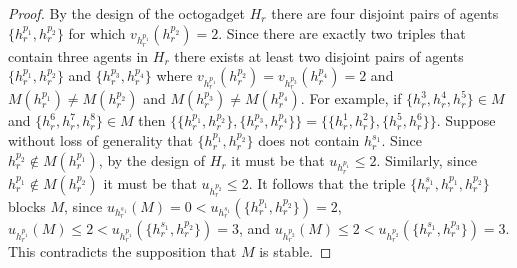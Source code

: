 \begin{proof}
By the design of the octogadget $H_r$ there are four disjoint pairs of agents $\{ h_r^{p_1}, h_r^{p_2} \}$ for which $v_{h_r^{p_1}}(h_r^{p_2})=2$. Since there are exactly two triples that contain three agents in $H_r$ there exists at least two disjoint pairs of agents $\{ h_r^{p_1}, h_r^{p_2} \}$ and $\{ h_r^{p_3}, h_r^{p_4} \}$ where $v_{h_r^{p_1}}(h_r^{p_2})=v_{h_r^{p_3}}(h_r^{p_4})=2$ and $M(h_r^{p_1}) \neq M(h_r^{p_2})$ and $M(h_r^{p_3}) \neq M(h_r^{p_4})$. For example, if $\{ h_r^3, h_r^4, h_r^5 \} \in M$ and $\{ h_r^6, h_r^7, h_r^8 \} \in M$ then $\{ \{ h_r^{p_1}, h_r^{p_2} \}, \{ h_r^{p_3}, h_r^{p_4} \} \} = \{ \{ h_r^1, h_r^2 \}, \{ h_r^5, h_r^6 \} \}$. Suppose without loss of generality that $\{ h_r^{p_1}, h_r^{p_2} \}$ does not contain $h_r^{s_1}$. Since $h_r^{p_2} \notin M(h_r^{p_1})$, by the design of $H_r$ it must be that $u_{h_r^{p_1}}\leq 2$. Similarly, since $h_r^{p_1} \notin M(h_r^{p_2})$ it must be that $u_{h_r^{p_2}}\leq 2$. It follows that the triple $\{ h_r^{s_1}, h_r^{p_1}, h_r^{p_2} \}$ blocks $M$, since $u_{h_r^{s_1}}(M) = 0 < u_{h_r^{s_1}}(\{ h_r^{p_1}, h_r^{p_2} \}) = 2$, $u_{h_r^{p_1}}(M) \leq 2 < u_{h_r^{p_1}}(\{ h_r^{s_1}, h_r^{p_2} \}) = 3$, and $u_{h_r^{p_2}}(M) \leq 2 < u_{h_r^{p_2}}(\{ h_r^{s_1}, h_r^{p_3} \}) = 3$. This contradicts the supposition that $M$ is stable.
\end{proof}


